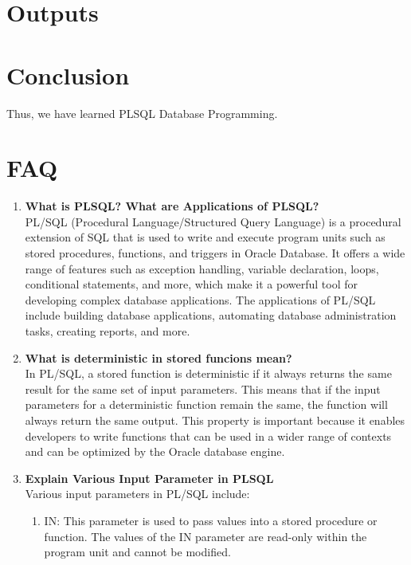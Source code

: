 \documentclass[11pt]{article}
\begin{document}
\section{Outputs}


\section{Conclusion}
Thus, we have learned PLSQL Database Programming.

\clearpage

\section{FAQ}
\begin{enumerate}
    \item \textbf{What is PLSQL? What are Applications of PLSQL?}\\
    
          PL/SQL (Procedural Language/Structured Query Language) is a procedural extension of SQL that is used to write and execute program units such as stored procedures, functions, and triggers in Oracle Database. It offers a wide range of features such as exception handling, variable declaration, loops, conditional statements, and more, which make it a powerful tool for developing complex database applications. The applications of PL/SQL include building database applications, automating database administration tasks, creating reports, and more.

    \item \textbf{What is deterministic in stored funcions mean?}\\
    
          In PL/SQL, a stored function is deterministic if it always returns the same result for the same set of input parameters. This means that if the input parameters for a deterministic function remain the same, the function will always return the same output. This property is important because it enables developers to write functions that can be used in a wider range of contexts and can be optimized by the Oracle database engine.

    \item \textbf{Explain Various Input Parameter in PLSQL}\\
    
          Various input parameters in PL/SQL include:

          \begin{enumerate}
            \item IN: This parameter is used to pass values into a stored procedure or function. The values of the IN parameter are read-only within the program unit and cannot be modified.
            

\end{enumerate}
\end{enumerate}
\end{document}
